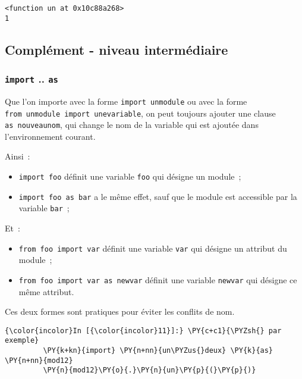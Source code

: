    \begin{Verbatim}[commandchars=\\\{\},frame=single,framerule=0.3mm,rulecolor=\color{cellframecolor}]
<function un at 0x10c88a268>
1
\end{Verbatim}

    \hypertarget{compluxe9ment---niveau-intermuxe9diaire}{%
\subsection{Complément - niveau
intermédiaire}\label{compluxe9ment---niveau-intermuxe9diaire}}

    \hypertarget{import-..-as}{%
\subsubsection{\texorpdfstring{\texttt{import} ..
\texttt{as}}{import .. as}}\label{import-..-as}}

    Que l'on importe avec la forme \texttt{import\ unmodule} ou avec la
forme \texttt{from\ unmodule\ import\ unevariable}, on peut toujours
ajouter une clause \texttt{as\ nouveaunom}, qui change le nom de la
variable qui est ajoutée dans l'environnement courant.

    Ainsi~:

\begin{itemize}
\tightlist
\item
  \texttt{import\ foo} définit une variable \texttt{foo} qui désigne un
  module~;
\item
  \texttt{import\ foo\ as\ bar} a le même effet, sauf que le module est
  accessible par la variable \texttt{bar}~;
\end{itemize}

    Et~:

\begin{itemize}
\tightlist
\item
  \texttt{from\ foo\ import\ var} définit une variable \texttt{var} qui
  désigne un attribut du module~;
\item
  \texttt{from\ foo\ import\ var\ as\ newvar} définit une variable
  \texttt{newvar} qui désigne ce même attribut.
\end{itemize}

    Ces deux formes sont pratiques pour éviter les conflits de nom.

    \begin{Verbatim}[commandchars=\\\{\},frame=single,framerule=0.3mm,rulecolor=\color{cellframecolor}]
{\color{incolor}In [{\color{incolor}11}]:} \PY{c+c1}{\PYZsh{} par exemple}
         \PY{k+kn}{import} \PY{n+nn}{un\PYZus{}deux} \PY{k}{as} \PY{n+nn}{mod12}
         \PY{n}{mod12}\PY{o}{.}\PY{n}{un}\PY{p}{(}\PY{p}{)}
\end{Verbatim}


